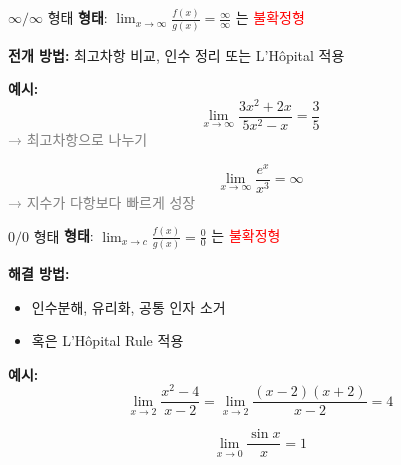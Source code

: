 \documentclass[aspectratio=169]{beamer}
\begin{document}
\begin{frame}{$ \infty / \infty $ 형태}
  \textbf{형태}: \( \lim_{x \to \infty} \frac{f(x)}{g(x)} = \frac{\infty}{\infty} \) 는 \textcolor{red}{불확정형}

  \vspace{0.5em}
  \textbf{전개 방법:} 최고차항 비교, 인수 정리 또는 L'Hôpital 적용

  \vspace{1em}
  \textbf{예시:}
  \[
    \lim_{x \to \infty} \frac{3x^2 + 2x}{5x^2 - x} = \frac{3}{5}
  \]
  \textcolor{gray}{→ 최고차항으로 나누기}

  \[
    \lim_{x \to \infty} \frac{e^x}{x^3} = \infty
  \]
  \textcolor{gray}{→ 지수가 다항보다 빠르게 성장}
\end{frame}



\begin{frame}{$ 0 / 0 $ 형태}
  \textbf{형태}: \( \lim_{x \to c} \frac{f(x)}{g(x)} = \frac{0}{0} \) 는 \textcolor{red}{불확정형}

  \vspace{0.5em}
  \textbf{해결 방법:}
  \begin{itemize}
    \item 인수분해, 유리화, 공통 인자 소거
    \item 혹은 L'Hôpital Rule 적용
  \end{itemize}

  \vspace{1em}
  \textbf{예시:}
  \[
    \lim_{x \to 2} \frac{x^2 - 4}{x - 2} = \lim_{x \to 2} \frac{(x-2)(x+2)}{x-2} = 4
  \]

  \[
    \lim_{x \to 0} \frac{\sin x}{x} = 1
  \]
\end{frame}
\end{document}
